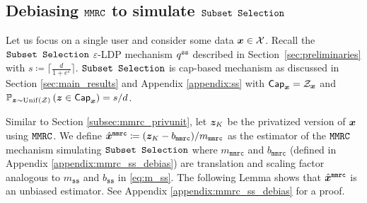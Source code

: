 \subsection{Debiasing \texorpdfstring{$\MMRC$}{MMRC} to simulate \texorpdfstring{$\SubsetSelection$}{Subset Selection}}
\label{subsec:mmrc_ss}
Let us focus on a single user and consider some data ${\boldsymbol{x}} \in \mathcal{X}$.
Recall the $\SubsetSelection$ $\varepsilon$-LDP mechanism $q^{\texttt{ss}}$ described in Section~\ref{sec:preliminaries} with $s \coloneqq \lceil \frac{d}{1+e^\varepsilon}\rceil$. $\SubsetSelection$ is cap-based mechanism as discussed in Section \ref{sec:main_results} and Appendix \ref{appendix:ss} with $\mathsf{Cap}_{{\boldsymbol{x}}} = \mathcal{Z}_{{\boldsymbol{x}}}$ and $\mathbb{P}_{{\boldsymbol{z}} \sim \mathrm{Unif}(\mathcal{Z})}\left( {\boldsymbol{z}} \in \mathsf{Cap}_{{\boldsymbol{x}}} \right) = s/d$.
\iffalse
Let $\piMMRC$ be the distribution and $\svbz_1, \svbz_2,...,\svbz_N$ be the candidates obtained from Algorithm \ref{alg:mmrc} when the reference distribution is uniform on $\cZ$ defined in Section BLAH. Let $K \sim \piMMRC(\cdot)$. Recall that $\theta$ is the fraction of candidates inside the $\msf{Cap}_{\svbx}$. It is easy to see that $\theta \sim \frac{1}{N}\msf{Binom}\lp N, \frac{s}{d} \rp$. Further, define 
\begin{align}
    b_\texttt{mmrc} \coloneqq \frac{1}{d-1} \bigg(s - \E \bigg[ \frac{e^\epsilon\theta \cdot \Indicator \lp\theta\leq \E\lb\theta\rb \rp}{e^\epsilon \E\lb\theta\rb + (1-\E \lb\theta\rb)}   \\
    + \frac{e^\epsilon \E \lb\theta\rb +\theta- \E \lb\theta\rb}{e^\epsilon \E\lb\theta\rb + (1-\E \lb\theta\rb)}  \cdot \Indicator \lp\theta> \E\lb\theta\rb \rp \bigg] \bigg)
\end{align}
and $m_\texttt{mmrc} \coloneqq s - d\cdot b_\texttt{mmrc}$. Define $\hat{\svbx}^\texttt{mmrc} \coloneqq (\svbz_K- b_\texttt{mmrc} )/ m_\texttt{mmrc}$ as the estimator of the $\MMRC$ mechanism simulating $\SubsetSelection$.  
\fi
Similar to Section \ref{subsec:mmrc_privunit}, let ${\boldsymbol{z}}_K$ be the privatized version of ${\boldsymbol{x}}$ using $\MMRC$. We define $\hat{\svbx}^\texttt{mmrc} \coloneqq (\svbz_K- b_\texttt{mmrc} )/ m_\texttt{mmrc}$ as the estimator of the $\MMRC$ mechanism simulating $\SubsetSelection$ where $m_\texttt{mmrc}$ and $b_\texttt{mmrc}$ (defined in Appendix \ref{appendix:mmrc_ss_debias}) are translation and scaling factor analogous to $m_\texttt{ss}$ and $b_\texttt{ss}$ in \eqref{eq:m_ss}. The following Lemma shows that $\hat{{\boldsymbol{x}}}^\texttt{mmrc}$ is an unbiased estimator. See Appendix \ref{appendix:mmrc_ss_debias} for a proof.

